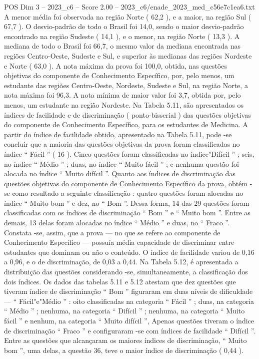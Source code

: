 \begin{textsample}{POS Dim 3 – 2023\_c6 – Score 2.00 – 2023\_c6/enade\_2023\_med\_c56e7c1ea6.txt}
A menor média foi observada na região Norte ( 62,2 ), e a maior, na região Sul ( 67,7 ).
O desvio-padrão de todo o Brasil foi 14,0, sendo o maior desvio-padrão encontrado na região Sudeste ( 14,1 ), e o menor, na região Norte ( 13,3 ).
A mediana de todo o Brasil foi 66,7, o mesmo valor da mediana encontrada nas regiões Centro-Oeste, Sudeste e Sul, e superior às medianas das regiões Nordeste e Norte ( 63,0 ).
A nota máxima da prova foi 100,0, obtida, nas questões objetivas do componente de Conhecimento Específico, por, pelo menos, um estudante das regiões Centro-Oeste, Nordeste, Sudeste e Sul, na região Norte, a nota máxima foi 96,3.
A nota mínima de maior valor foi 3,7, obtida por, pelo menos, um estudante na região Nordeste.
Na Tabela 5.11, são apresentados os índices de facilidade e de discriminação ( ponto-bisserial ) das questões objetivas do componente de Conhecimento Específico, para os estudantes de Medicina.
A partir do índice de facilidade obtido, apresentado na Tabela 5.11, pode -se concluir que a maioria das questões objetivas da prova foram classificadas no índice “ Fácil ” ( 16 ).
Cinco questões foram classificadas no índice"Difícil ” ; seis, no índice “ Médio ” ; duas, no índice “ Muito fácil ” ; e nenhuma questão foi alocada no índice “ Muito difícil ”.
Quanto aos índices de discriminação das questões objetivas do componente de Conhecimento Específico da prova, obtém -se como resultado a seguinte classificação : quatro questões foram alocadas no índice “ Muito bom ” e dez, no “ Bom ”.
Dessa forma, 14 das 29 questões foram classificadas com os índices de discriminação “ Bom ” e “ Muito bom ”.
Entre as demais, 13 delas foram alocadas no índice “ Médio ” e duas, no “ Fraco ”.
Constata -se, assim, que a prova — no que se refere ao componente de Conhecimento Específico — possuía média capacidade de discriminar entre estudantes que dominam ou não o conteúdo.
O índice de facilidade variou de 0,16 a 0,96, e o de discriminação, de 0,03 a 0,44.
Na Tabela 5.12, é apresentada a distribuição das questões considerando -se, simultaneamente, a classificação dos dois índices.
Os dados das tabelas 5.11 e 5.12 atestam que dez questões que tiveram índice de discriminação “ Bom ” figuraram em duas níveis de dificuldade — “ Fácil"e"Médio ” : oito classificadas na categoria “ Fácil ” ; duas, na categoria “ Médio ” ; nenhuma, na categoria “ Difícil ” ; nenhuma, na categoria “ Muito fácil ” e nenhum, na categoria “ Muito difícil ”, Apenas questões tiveram o índice de discriminação “ Fraco ” e configuraram -se com índices de facilidade “ Difícil ”.
Entre as questões que alcançaram os maiores índices de discriminação, “ Muito bom ”, uma delas, a questão 36, teve o maior índice de discriminação ( 0,44 ).

\end{textsample}
